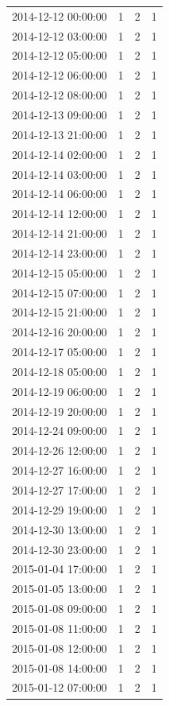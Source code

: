 \begin{tabular}{lrrr}
2014-12-12 00:00:00 & 1 & 2 & 1 \\
2014-12-12 03:00:00 & 1 & 2 & 1 \\
2014-12-12 05:00:00 & 1 & 2 & 1 \\
2014-12-12 06:00:00 & 1 & 2 & 1 \\
2014-12-12 08:00:00 & 1 & 2 & 1 \\
2014-12-13 09:00:00 & 1 & 2 & 1 \\
2014-12-13 21:00:00 & 1 & 2 & 1 \\
2014-12-14 02:00:00 & 1 & 2 & 1 \\
2014-12-14 03:00:00 & 1 & 2 & 1 \\
2014-12-14 06:00:00 & 1 & 2 & 1 \\
2014-12-14 12:00:00 & 1 & 2 & 1 \\
2014-12-14 21:00:00 & 1 & 2 & 1 \\
2014-12-14 23:00:00 & 1 & 2 & 1 \\
2014-12-15 05:00:00 & 1 & 2 & 1 \\
2014-12-15 07:00:00 & 1 & 2 & 1 \\
2014-12-15 21:00:00 & 1 & 2 & 1 \\
2014-12-16 20:00:00 & 1 & 2 & 1 \\
2014-12-17 05:00:00 & 1 & 2 & 1 \\
2014-12-18 05:00:00 & 1 & 2 & 1 \\
2014-12-19 06:00:00 & 1 & 2 & 1 \\
2014-12-19 20:00:00 & 1 & 2 & 1 \\
2014-12-24 09:00:00 & 1 & 2 & 1 \\
2014-12-26 12:00:00 & 1 & 2 & 1 \\
2014-12-27 16:00:00 & 1 & 2 & 1 \\
2014-12-27 17:00:00 & 1 & 2 & 1 \\
2014-12-29 19:00:00 & 1 & 2 & 1 \\
2014-12-30 13:00:00 & 1 & 2 & 1 \\
2014-12-30 23:00:00 & 1 & 2 & 1 \\
2015-01-04 17:00:00 & 1 & 2 & 1 \\
2015-01-05 13:00:00 & 1 & 2 & 1 \\
2015-01-08 09:00:00 & 1 & 2 & 1 \\
2015-01-08 11:00:00 & 1 & 2 & 1 \\
2015-01-08 12:00:00 & 1 & 2 & 1 \\
2015-01-08 14:00:00 & 1 & 2 & 1 \\
2015-01-12 07:00:00 & 1 & 2 & 1 \\

\end{tabular}
